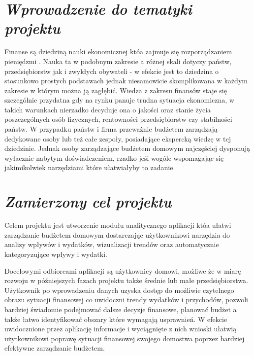 \documentclass[a4paper,10pt, twoside]{report}
\newcommand{\customstylechapter}[1]{\large{\textit{#1}}}
\begin{document}
\null\newpage %

\renewcommand*\contentsname{Spis treści}
\tableofcontents                    %


\chapter{\customstylechapter{Wprowadzenie do tematyki projektu}}
{Finanse są dziedziną nauki ekonomicznej któa zajmuje się rozporządzaniem 
pieniędzmi \cite{wiki_ekonomia}. Nauka ta w podobnym zakresie a różnej skali 
dotyczy państw, przedsiębiorstw jak i zwykłych obywateli - w efekcie jest to 
dziedzina o stosunkowo prostych podstawach jednak niesamowicie skomplikowana w 
każdym zakresie w którym można ją zagłębić. Wiedza z zakresu finansów staje się 
szczególnie przydatna gdy na rynku panuje trudna sytuacja ekonomiczna, w takich 
warunkach nierzadko decyduje ona o jakości oraz stanie życia poszczególnych 
osób fizycznych, rentowności przedsiębiorstw czy stabilności państw. W przypadku
 państw i firma przeważnie budżetem zarządzają dedykowane osoby lub też całe 
zespoły, posiadające ekspercką wiedzę w tej dziedzinie. Jednak osoby 
zarządzające budżetem domowym najczęściej dysponują wyłacznie nabytym 
doświadczeniem, rzadko jeśi wogóle wspomagając się jakimikolwiek narzędziami 
które ułatwiałyby to zadanie.}
%
\chapter{\customstylechapter{Zamierzony cel projektu}}
{Celem projektu jest utworzenie modułu analitycznego aplikacji któa ułatwi 
zarządzanie budżetem domowym dostarczając użytkownikowi narzędzia do analizy 
wpływów i wydatków, wizualizacji trendów oraz automatycznie kategoryzujące 
wpływy i wydatki.} 

{Docelowymi odbiorcami aplikacji są użytkownicy domowi, możliwe że w miarę 
rozwoju w późniejszych fazach projektu także średnie lub małe przedsiębiorstwa. 
Użytkownik po wprowadzeniu danych uzyska dostęp do możliwie czytelnego obrazu 
sytuacji finansowej co uwidoczni trendy wydatków i przychodów, pozwoli bardziej
 świadomie podejmować dalsze decyzje finansowe, planować budżet a także łatwo
 identyfikować obszary które wymagają usprawnień. W efekcie uwidocznione przez
 aplikację informacje i wyciągnięte z nich wnioski ułatwią użytkownikowi poprawę
 sytuacji finansowej swojego domostwa poprzez bardziej efektywne zarządzanie
 budżetem.}
%
\end{document}
